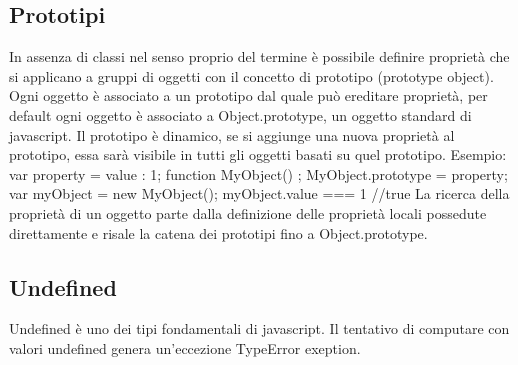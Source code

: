 \subsection{Prototipi}
In assenza di classi nel senso proprio del termine è possibile definire proprietà che si applicano a gruppi di oggetti con il concetto di prototipo (prototype object). Ogni oggetto è associato a un prototipo dal quale può ereditare proprietà, per default ogni oggetto è associato a Object.prototype, un oggetto standard di javascript. Il prototipo è dinamico, se si aggiunge una nuova proprietà al prototipo, essa sarà visibile in tutti gli oggetti basati su quel prototipo.\newline
Esempio:\newline
var property = {value : 1};\newline
function MyObject() {};\newline
MyObject.prototype = property;\newline
var myObject = new MyObject();\newline
myObject.value === 1 //true \newline
\newline
La ricerca della proprietà di un oggetto parte dalla definizione delle proprietà locali possedute direttamente e risale la catena dei prototipi fino a Object.prototype.
\subsection{Undefined}
Undefined è uno dei tipi fondamentali di javascript. Il tentativo di computare con valori undefined genera un'eccezione TypeError exeption.